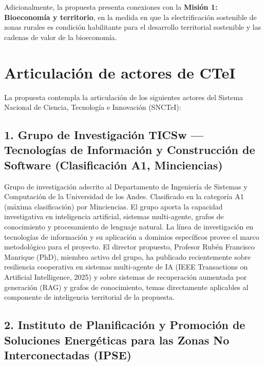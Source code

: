 \documentclass[12pt,letterpaper]{article}
\begin{document}
\medskip

Adicionalmente, la propuesta presenta conexiones con la \textbf{Misi\'on 1: Bioeconom\'ia y territorio}, en la medida en que la electrificaci\'on sostenible de zonas rurales es condici\'on habilitante para el desarrollo territorial sostenible y las cadenas de valor de la bioeconom\'ia.

\section{Articulaci\'on de actores de CTeI}

La propuesta contempla la articulaci\'on de los siguientes actores del Sistema Nacional de Ciencia, Tecnolog\'ia e Innovaci\'on (SNCTeI):

\subsection*{1. Grupo de Investigaci\'on TICSw --- Tecnolog\'ias de Informaci\'on y Construcci\'on de Software (Clasificaci\'on A1, Minciencias)}

Grupo de investigaci\'on adscrito al Departamento de Ingenier\'ia de Sistemas y Computaci\'on de la Universidad de los Andes. Clasificado en la categor\'ia A1 (m\'axima clasificaci\'on) por Minciencias. El grupo aporta la capacidad investigativa en inteligencia artificial, sistemas multi-agente, grafos de conocimiento y procesamiento de lenguaje natural. La l\'inea de investigaci\'on en tecnolog\'ias de informaci\'on y su aplicaci\'on a dominios espec\'ificos provee el marco metodol\'ogico para el proyecto. El director propuesto, Profesor Rub\'en Francisco Manrique (PhD), miembro activo del grupo, ha publicado recientemente sobre resiliencia cooperativa en sistemas multi-agente de IA (IEEE Transactions on Artificial Intelligence, 2025) y sobre sistemas de recuperaci\'on aumentada por generaci\'on (RAG) y grafos de conocimiento, temas directamente aplicables al componente de inteligencia territorial de la propuesta.

\subsection*{2. Instituto de Planificaci\'on y Promoci\'on de Soluciones Energ\'eticas para las Zonas No Interconectadas (IPSE)}
\end{document}

